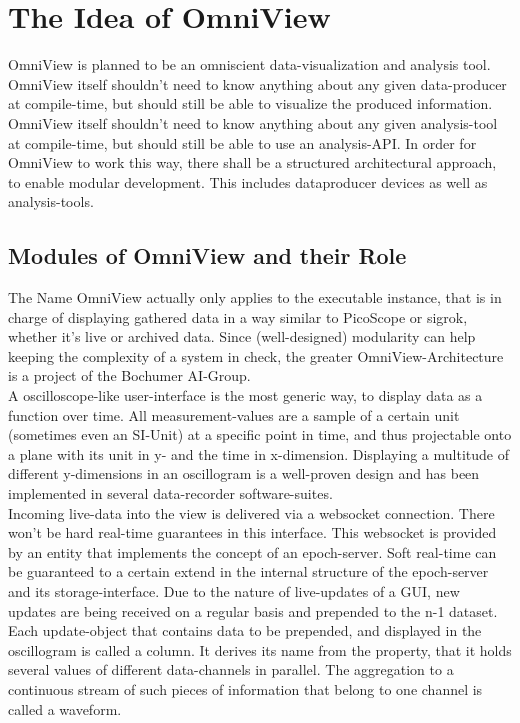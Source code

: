 \documentclass[]{scrreprt}
\begin{document}
\chapter{The Idea of OmniView}
OmniView is planned to be an omniscient data-visualization and analysis tool.
OmniView itself shouldn't need to know anything about any given data-producer at compile-time, but should still be able to visualize the produced information.
OmniView itself shouldn't need to know anything about any given analysis-tool at compile-time, but should still be able to use an analysis-API.
In order for OmniView to work this way, there shall be a structured architectural approach, to enable modular development.
This includes dataproducer devices as well as analysis-tools.


\section[Modules]{Modules of OmniView and their Role}
The Name OmniView actually only applies to the executable instance, that is in charge of displaying gathered data in a way similar to PicoScope or sigrok, whether it's live or archived data.
Since (well-designed) modularity can help keeping the complexity of a system in check, the greater OmniView-Architecture is a project of the Bochumer AI-Group.
\\
A oscilloscope-like user-interface is the most generic way, to display data as a function over time.
All measurement-values are a sample of a certain unit (sometimes even an SI-Unit) at a specific point in time, and thus projectable onto a plane with its unit in y- and the time in x-dimension.
Displaying a multitude of different y-dimensions in an oscillogram is a well-proven design and has been implemented in several data-recorder software-suites.
\\
Incoming live-data into the view is delivered via a websocket connection.
There won't be hard real-time guarantees in this interface.
This websocket is provided by an entity that implements the concept of an epoch-server.
Soft real-time can be guaranteed to a certain extend in the internal structure of the epoch-server and its storage-interface.
Due to the nature of live-updates of a GUI, new updates are being received on a regular basis and prepended to the n-1 dataset.
Each update-object that contains data to be prepended, and displayed in the oscillogram is called a column.
It derives its name from the property, that it holds several values of different data-channels in parallel.
The aggregation to a continuous stream of such pieces of information that belong to one channel is called a waveform.
\end{document}
